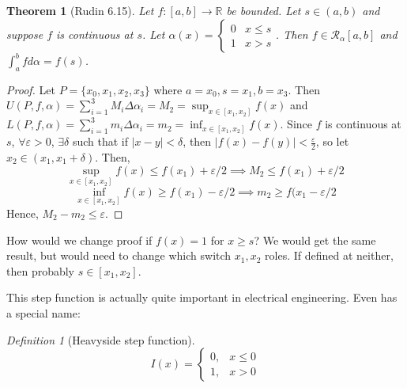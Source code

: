 \documentclass{article}
\theoremstyle{plain}
\newtheorem{theorem}{Theorem}
\theoremstyle{remark}
\newtheorem{definition}{Definition}
\newcommand{\R}{{\mathbb R}}
\newcommand{\ep}{{\varepsilon}}
\begin{document}
\begin{theorem}[Rudin 6.15]
	Let $f \colon [a,b] \to \R$ be bounded.
	Let $s \in (a,b)$ and suppose $f$ is continuous at $s$.
	Let $\alpha(x) = \begin{cases} 0 & x \leq s \\ 1 & x > s\end{cases}$.
	Then $f \in \mathcal{R}_\alpha[a,b]$ and $\int_a^b fd\alpha = f(s)$.
\end{theorem}
\begin{proof}
	Let $P = \{x_0,x_1,x_2,x_3\}$ where $a = x_0, s = x_1, b = x_3$.
	Then $U(P,f,\alpha) = \sum_{i=1}^3 M_i \Delta \alpha_i = M_2 = \sup_{x\in[x_1,x_2]}f(x)$
	and $L(P,f,\alpha) = \sum_{i=1}^3 m_i \Delta \alpha_i = m_2 = \inf_{x\in[x_1,x_2]}f(x)$.
	Since $f$ is continuous at $s$, $\forall \ep > 0$, $\exists \delta$
	such that if $|x-y| < \delta$, then $|f(x) - f(y)| < \frac{\ep}{2}$,
	so let $x_2 \in (x_1,x_1+\delta)$.
	Then,
	\[
		\sup_{x\in[x_1,x_2]}f(x) \leq f(x_1) + \ep/2 \implies M_2 \leq f(x_1) + \ep/2
	\]
	\[
		\inf_{x\in[x_1,x_2]}f(x) \geq f(x_1) - \ep/2 \implies m_2 \geq f(x_1 - \ep/2
	\]
	Hence, $M_2 - m_2 \leq \ep$.
\end{proof}
How would we change proof if $f(x) = 1$ for $x \geq s$?
We would get the same result, but would need to change which switch $x_1,x_2$ roles.
If defined at neither, then probably $s \in [x_1,x_2]$.

This step function is actually quite important in electrical engineering.
Even has a special name:
\begin{definition}[Heavyside step function]
	\[
		I(x) = \begin{cases} 0, & x \leq 0\\ 1, & x > 0\end{cases}
	\]
\end{definition}
\end{document}
